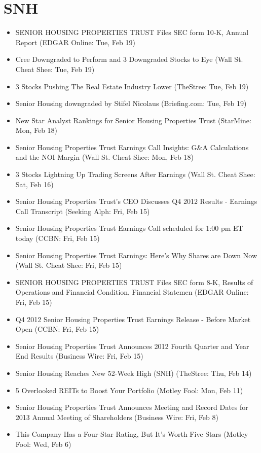 \documentclass[11pt,asymmetric]{article}
\begin{document}
\section*{SNH}
\begin{itemize}
\item SENIOR HOUSING PROPERTIES TRUST Files SEC form 10-K, Annual Report (EDGAR Online: Tue, Feb 19)
\item Cree Downgraded to Perform and 3 Downgraded Stocks to Eye (Wall St. Cheat Shee: Tue, Feb 19)
\item 3 Stocks Pushing The Real Estate Industry Lower (TheStree: Tue, Feb 19)
\item Senior Housing downgraded by Stifel Nicolaus (Briefing.com: Tue, Feb 19)
\item New Star Analyst Rankings for Senior Housing Properties Trust (StarMine: Mon, Feb 18)
\item Senior Housing Properties Trust Earnings Call Insights: G\&A Calculations and the NOI Margin (Wall St. Cheat Shee: Mon, Feb 18)
\item 3 Stocks Lightning Up Trading Screens After Earnings (Wall St. Cheat Shee: Sat, Feb 16)
\item Senior Housing Properties Trust's CEO Discusses Q4 2012 Results - Earnings Call Transcript (Seeking Alph: Fri, Feb 15)
\item Senior Housing Properties Trust Earnings Call scheduled for 1:00 pm ET today (CCBN: Fri, Feb 15)
\item Senior Housing Properties Trust Earnings: Here’s Why Shares are Down Now (Wall St. Cheat Shee: Fri, Feb 15)
\item SENIOR HOUSING PROPERTIES TRUST Files SEC form 8-K, Results of Operations and Financial Condition, Financial Statemen (EDGAR Online: Fri, Feb 15)
\item Q4 2012 Senior Housing Properties Trust Earnings Release - Before Market Open (CCBN: Fri, Feb 15)
\item Senior Housing Properties Trust Announces 2012 Fourth Quarter and Year End Results (Business Wire: Fri, Feb 15)
\item Senior Housing Reaches New 52-Week High (SNH) (TheStree: Thu, Feb 14)
\item 5 Overlooked REITs to Boost Your Portfolio (Motley Fool: Mon, Feb 11)
\item Senior Housing Properties Trust Announces Meeting and Record Dates for 2013 Annual Meeting of Shareholders (Business Wire: Fri, Feb 8)
\item This Company Has a Four-Star Rating, But It’s Worth Five Stars (Motley Fool: Wed, Feb 6)

\end{itemize}
\end{document}
